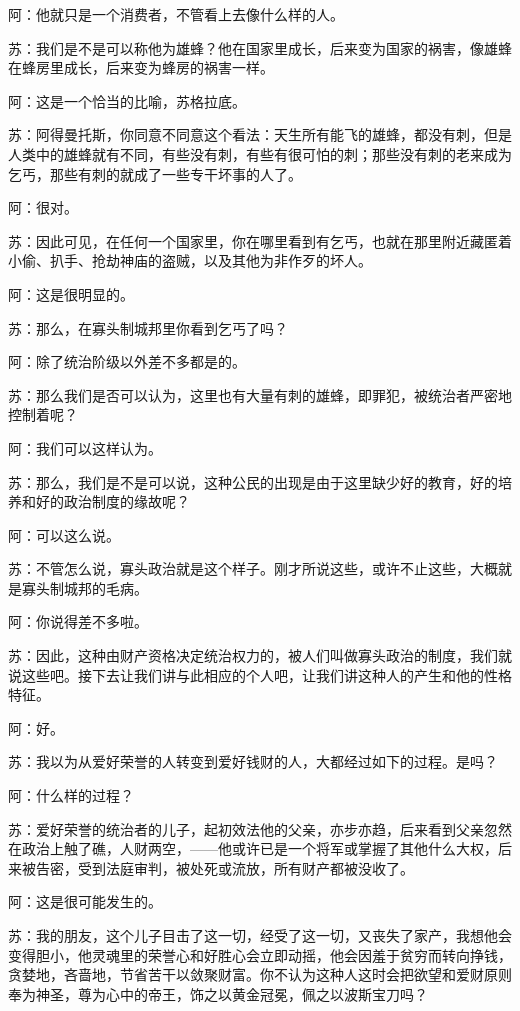 \documentclass[12pt,oneside]{book}
\begin{document}
阿：他就只是一个消费者，不管看上去像什么样的人。

苏：我们是不是可以称他为雄蜂？他在国家里成长，后来变为国家的祸害，像雄蜂在蜂房里成长，后来变为蜂房的祸害一样。

阿：这是一个恰当的比喻，苏格拉底。

苏：阿得曼托斯，你同意不同意这个看法：天生所有能飞的雄蜂，都没有刺，但是人类中的雄蜂就有不同，有些没有刺，有些有很可怕的刺；那些没有刺的老来成为乞丐，那些有刺的就成了一些专干坏事的人了。

阿：很对。

苏：因此可见，在任何一个国家里，你在哪里看到有乞丐，也就在那里附近藏匿着小偷、扒手、抢劫神庙的盗贼，以及其他为非作歹的坏人。

阿：这是很明显的。

苏：那么，在寡头制城邦里你看到乞丐了吗？

阿：除了统治阶级以外差不多都是的。

苏：那么我们是否可以认为，这里也有大量有刺的雄蜂，即罪犯，被统治者严密地控制着呢？

阿：我们可以这样认为。

苏：那么，我们是不是可以说，这种公民的出现是由于这里缺少好的教育，好的培养和好的政治制度的缘故呢？

阿：可以这么说。

苏：不管怎么说，寡头政治就是这个样子。刚才所说这些，或许不止这些，大概就是寡头制城邦的毛病。

阿：你说得差不多啦。

苏：因此，这种由财产资格决定统治权力的，被人们叫做寡头政治的制度，我们就说这些吧。接下去让我们讲与此相应的个人吧，让我们讲这种人的产生和他的性格特征。

阿：好。

苏：我以为从爱好荣誉的人转变到爱好钱财的人，大都经过如下的过程。是吗？

阿：什么样的过程？

苏：爱好荣誉的统治者的儿子，起初效法他的父亲，亦步亦趋，后来看到父亲忽然在政治上触了礁，人财两空，——他或许已是一个将军或掌握了其他什么大权，后来被告密，受到法庭审判，被处死或流放，所有财产都被没收了。

阿：这是很可能发生的。

苏：我的朋友，这个儿子目击了这一切，经受了这一切，又丧失了家产，我想他会变得胆小，他灵魂里的荣誉心和好胜心会立即动摇，他会因羞于贫穷而转向挣钱，贪婪地，吝啬地，节省苦干以敛聚财富。你不认为这种人这时会把欲望和爱财原则奉为神圣，尊为心中的帝王，饰之以黄金冠冕，佩之以波斯宝刀吗？
\end{document}
